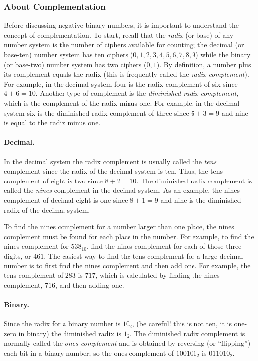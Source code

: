\subsubsection{About Complementation}
\label{MO:subsub:about_complementation}

Before discussing negative binary numbers, it is important to understand the concept of complementation. To start, recall that the \emph{radix} (or base) of any number system is the number of ciphers available for counting; the decimal (or base-ten) number system has ten ciphers ($ 0, 1, 2, 3, 4, 5, 6, 7, 8, 9 $) while the binary (or base-two) number system has two ciphers ($ 0, 1 $). By definition, a number plus its complement equals the radix (this is frequently called the \emph{radix complement}). For example, in the decimal system four is the radix complement of six since $ 4 + 6 = 10 $. Another type of complement is the \emph{diminished radix complement}, which is the complement of the radix minus one. For example, in the decimal system six is the diminished radix complement of three since $ 6 + 3 = 9 $ and nine is equal to the radix minus one.

\paragraph{Decimal.} In the decimal system the radix complement is usually called the \emph{tens} complement since the radix of the decimal system is ten. Thus, the tens complement of eight is two since $ 8 + 2 = 10 $. The diminished radix complement is called the \emph{nines} complement in the decimal system. As an example, the nines complement of decimal eight is one since $ 8 + 1 = 9 $ and nine is the diminished radix of the decimal system. 

To find the nines complement for a number larger than one place, the nines complement must be found for each place in the number. For example, to find the nines complement for $ 538_{10} $, find the nines complement for each of those three digits, or $ 461 $. The easiest way to find the tens complement for a large decimal number is to first find the nines complement and then add one. For example, the tens complement of $ 283 $ is $ 717 $, which is calculated by finding the nines complement, $ 716 $, and then adding one.

\paragraph{Binary.} Since the radix for a binary number is $ 10_2 $, (be careful! this is not ten, it is one-zero in binary) the diminished radix is $ 1_2 $. The diminished radix complement is normally called the \emph{ones complement} and is obtained by reversing (or ``flipping'') each bit in a binary number; so the ones complement of $ 100101_2 $ is $ 011010_2 $. 

